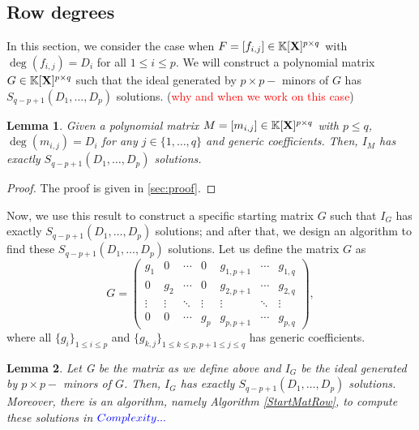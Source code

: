 \documentclass[11pt]{article}
\numberwithin{Property}{section}
\numberwithin{Theorem}{section}
\numberwithin{Proposition}{section}
\newtheorem{Lemma}{Lemma}%
\numberwithin{Lemma}{section}
\numberwithin{Corollary}{section}
\numberwithin{Definition}{section}
\numberwithin{Remark}{section}
\numberwithin{Conjecture}{section}
\numberwithin{Problem}{section}
\numberwithin{Example}{section}
\numberwithin{Claim}{section}
\renewcommand{\leq}{\leqslant}
\newcommand{\field}{\mathbb{K}} %
\newcommand{\mat}[1]{\mathbf{\MakeUppercase{#1}}} %
\newcommand{\todo}[1]{\textcolor{red}{#1}} %
\newcommand{\improve}[1]{\textcolor{blue}{#1}} %
\begin{document}
\subsection{Row degrees}
In this section, we consider the case when $F = [f_{i,j}] \in \field[\mat{X}]^{p\times q}$ with $\deg({f_{i,j}}) = D_i$ for all $1 \leq i \leq p$. We will construct a polynomial matrix $G \in \field[\mat{X}]^{p \times q}$ such that the ideal generated by $p \times p-$ minors of $G$ has $S_{q-p+1}(D_1, \ldots, D_p)$ solutions.
(\todo{why and when we work on this case})
\begin{Lemma} \label{P4}
Given a polynomial matrix $M = [m_{i,j}] \in \field[\mat{X}]^{p \times q}$ with $p \leq q$, $\deg({m_{i,j}}) = D_i$ for any $j \in \{1, \ldots, q\}$ and generic coefficients. Then, $I_M$ has exactly $ S_{q - p + 1}(D_1, \ldots, D_p)$ solutions. 
\end{Lemma}
\begin{proof}
The proof is given in \improve{\cref{sec:proof}}. 
\end{proof}
Now, we use this result to construct a specific starting matrix $G$ such that $I_G$ has exactly $ S_{q - p + 1}(D_1, \ldots, D_p)$ solutions; and after that, we design an algorithm to find these $S_{q-p+1}(D_1, \ldots, D_p)$ solutions. Let us define the matrix $G$ as
\[ G = \left( \begin{matrix}
g_1 & 0 & \cdots & 0 & g_{1,p+1} & \cdots & g_{1, q}\\
0 & g_2 & \cdots & 0 & g_{2,p+1} & \cdots & g_{2, q}\\
\vdots & \vdots & \ddots & \vdots & \vdots & \ddots & \vdots\\
0 & 0 & \cdots & g_p & g_{p,p+1} & \cdots & g_{p, q}
\end{matrix} \right), \] where all $\{g_i\}_{1 \leq i \leq p}$ and $\{g_{k,j}\}_{1 \leq k \leq p, p+1\leq j \leq q}$ has generic coefficients.
\begin{Lemma}\label{P3} Let G be the matrix as we define above and $I_G$ be the ideal generated by $p \times p-$ minors of $G$. Then, $I_G$ has exactly $S_{q-p+1}(D_1, \ldots, D_p)$ solutions. Moreover, there is an algorithm, namely Algorithm \ref{StartMatRow}, to compute these solutions in $\improve{Complexity...}$
\end{Lemma}
\end{document}
